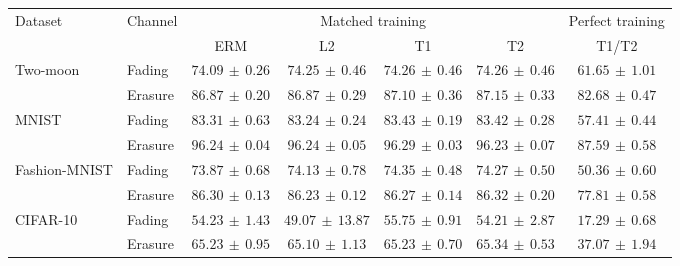 \begin{tabular*}{\linewidth}{@{\extracolsep{\fill}}llccccc@{}}
\toprule
\multirow{2}{*}{Dataset} & \multirow{2}{*}{Channel} & \multicolumn{4}{c}{Matched training} & Perfect training \\
\cmidrule(lr){3-6}\cmidrule(l){7-7}
 & & ERM & L2 & T1 & T2 & T1/T2 \\
\midrule
\multirow{2}{*}{Two-moon} & Fading & $74.09\,\pm\,0.26$ & $74.25\,\pm\,0.46$ & $74.26\,\pm\,0.46$ & $\mathbf{74.26}\,\pm\,0.46$ & $61.65\,\pm\,1.01$ \\
 & Erasure & $86.87\,\pm\,0.20$ & $86.87\,\pm\,0.29$ & $87.10\,\pm\,0.36$ & $\mathbf{87.15}\,\pm\,0.33$ & $82.68\,\pm\,0.47$ \\
\midrule[0.25pt]
\multirow{2}{*}{MNIST} & Fading & $83.31\,\pm\,0.63$ & $83.24\,\pm\,0.24$ & $\mathbf{83.43}\,\pm\,0.19$ & $83.42\,\pm\,0.28$ & $57.41\,\pm\,0.44$ \\
 & Erasure & $96.24\,\pm\,0.04$ & $96.24\,\pm\,0.05$ & $\mathbf{96.29}\,\pm\,0.03$ & $96.23\,\pm\,0.07$ & $87.59\,\pm\,0.58$ \\
\midrule[0.25pt]
\multirow{2}{*}{Fashion-MNIST} & Fading & $73.87\,\pm\,0.68$ & $74.13\,\pm\,0.78$ & $\mathbf{74.35}\,\pm\,0.48$ & $74.27\,\pm\,0.50$ & $50.36\,\pm\,0.60$ \\
 & Erasure & $86.30\,\pm\,0.13$ & $86.23\,\pm\,0.12$ & $86.27\,\pm\,0.14$ & $\mathbf{86.32}\,\pm\,0.20$ & $77.81\,\pm\,0.58$ \\
\midrule[0.25pt]
\multirow{2}{*}{CIFAR-10} & Fading & $54.23\,\pm\,1.43$ & $49.07\,\pm\,13.87$ & $\mathbf{55.75}\,\pm\,0.91$ & $54.21\,\pm\,2.87$ & $17.29\,\pm\,0.68$ \\
 & Erasure & $65.23\,\pm\,0.95$ & $65.10\,\pm\,1.13$ & $65.23\,\pm\,0.70$ & $\mathbf{65.34}\,\pm\,0.53$ & $37.07\,\pm\,1.94$ \\
\bottomrule
\end{tabular*}
